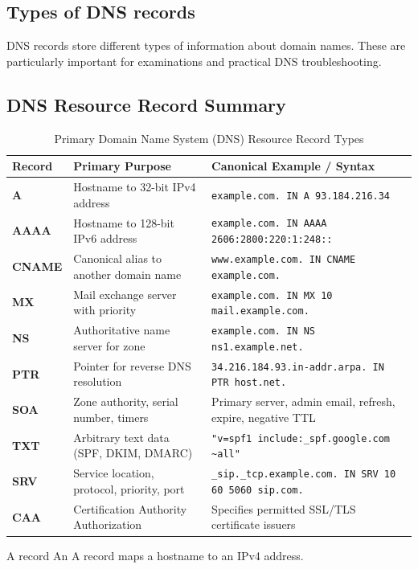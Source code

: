 \subsection{Types of DNS records}
DNS records store different types of information about domain names.
These are particularly important for examinations and practical DNS troubleshooting.
\subsection{DNS Resource Record Summary}
\begin{table}[htbp]
\centering
\caption{Primary Domain Name System (DNS) Resource Record Types}
\label{tab:dns_resource_records}
\begin{tabularx}{\textwidth}{p{2.2cm} p{4.2cm} X}
\toprule
\textbf{Record} & \textbf{Primary Purpose} & \textbf{Canonical Example / Syntax} \\
\midrule
\textbf{A} & Hostname to 32-bit IPv4 address & \texttt{example.com. IN A 93.184.216.34} \\
\textbf{AAAA} & Hostname to 128-bit IPv6 address & \texttt{example.com. IN AAAA 2606:2800:220:1:248::} \\
\textbf{CNAME} & Canonical alias to another domain name & \texttt{www.example.com. IN CNAME example.com.} \\
\textbf{MX} & Mail exchange server with priority & \texttt{example.com. IN MX 10 mail.example.com.} \\
\textbf{NS} & Authoritative name server for zone & \texttt{example.com. IN NS ns1.example.net.} \\
\textbf{PTR} & Pointer for reverse DNS resolution & \texttt{34.216.184.93.in-addr.arpa. IN PTR host.net.} \\
\textbf{SOA} & Zone authority, serial number, timers & Primary server, admin email, refresh, expire, negative TTL \\
\textbf{TXT} & Arbitrary text data (SPF, DKIM, DMARC) & \texttt{"v=spf1 include:\_spf.google.com \textasciitilde{}all"} \\
\textbf{SRV} & Service location, protocol, priority, port & \texttt{\_sip.\_tcp.example.com. IN SRV 10 60 5060 sip.com.} \\
\textbf{CAA} & Certification Authority Authorization & Specifies permitted SSL/TLS certificate issuers \\
\bottomrule
\end{tabularx}
\end{table}
A record
An A record maps a hostname to an IPv4 address.
